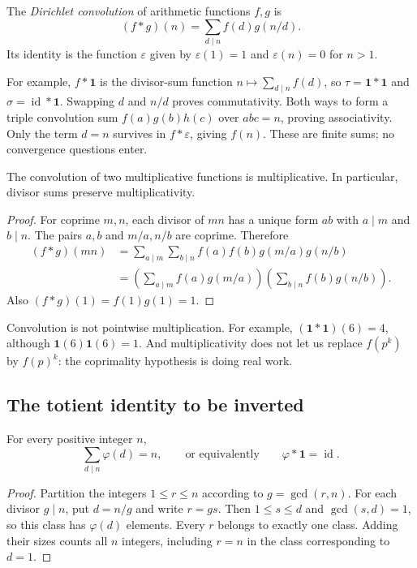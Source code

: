 \begin{definition}
The \emph{Dirichlet convolution} of arithmetic functions $f,g$ is
\[
 (f*g)(n)=\sum_{d\mid n}f(d)g(n/d).
\]
Its identity is the function $\varepsilon$ given by
$\varepsilon(1)=1$ and $\varepsilon(n)=0$ for $n>1$.
\end{definition}

For example, $f*\mathbf{1}$ is the divisor-sum function
$n\mapsto\sum_{d\mid n}f(d)$, so
$\tau=\mathbf{1}*\mathbf{1}$ and $\sigma=\operatorname{id}*\mathbf{1}$.
Swapping $d$ and $n/d$ proves commutativity. Both ways to form a triple
convolution sum $f(a)g(b)h(c)$ over $abc=n$, proving associativity.
Only the term $d=n$ survives in $f*\varepsilon$, giving $f(n)$.
These are finite sums; no convergence questions enter.

\begin{proposition}
The convolution of two multiplicative functions is multiplicative.
In particular, divisor sums preserve multiplicativity.
\end{proposition}
\begin{proof}
For coprime $m,n$, each divisor of $mn$ has a unique form $ab$ with
$a\mid m$ and $b\mid n$. The pairs $a,b$ and $m/a,n/b$ are coprime.
Therefore
\[
 \begin{aligned}
 (f*g)(mn)
 &=\sum_{a\mid m}\sum_{b\mid n} f(a)f(b)g(m/a)g(n/b)\\
 &=\left(\sum_{a\mid m}f(a)g(m/a)\right)
   \left(\sum_{b\mid n}f(b)g(n/b)\right).
 \end{aligned}
\]
Also $(f*g)(1)=f(1)g(1)=1$.
\end{proof}

\begin{warningbox}[breakable=false]
Convolution is not pointwise multiplication. For example,
$(\mathbf{1}*\mathbf{1})(6)=4$, although $\mathbf{1}(6)\mathbf{1}(6)=1$.
And multiplicativity does not let us replace $f(p^k)$ by $f(p)^k$:
the coprimality hypothesis is doing real work.
\end{warningbox}

\subsection*{The totient identity to be inverted}

\begin{proposition}
For every positive integer $n$,
\[
 \sum_{d\mid n}\varphi(d)=n,
 \qquad\text{or equivalently}\qquad
 \varphi*\mathbf{1}=\operatorname{id}.
\]
\end{proposition}
\begin{proof}
Partition the integers $1\le r\le n$ according to $g=\gcd(r,n)$.
For each divisor $g\mid n$, put $d=n/g$ and write $r=gs$.
Then $1\le s\le d$ and $\gcd(s,d)=1$, so this class has
$\varphi(d)$ elements. Every $r$ belongs to exactly one class.
Adding their sizes counts all $n$ integers, including $r=n$
in the class corresponding to $d=1$.
\end{proof}

